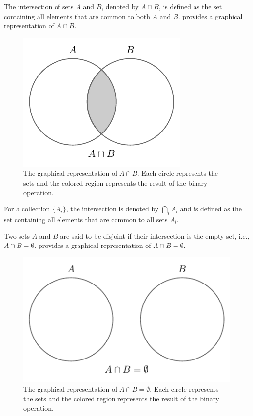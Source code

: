 \begin{definition}[Intersection]
	The intersection of sets $A$ and $B$, denoted by $A \cap B$, is defined as the set containing all elements that are common to both $A$ and $B$.  provides a graphical representation of $A \cap B$.
	\begin{figure}[H]
		\centering
		\includegraphics[]{figures/set_intersection.pdf}
		\caption{The graphical representation of $A\cap B$. Each circle represents the sets and the colored region represents the result of the binary operation.}
		\label{fig:set_intersection}
	\end{figure}
\end{definition}

\begin{definition}
	For a collection $\{A_i\}$, the intersection is denoted by $\bigcap_{i} A_i$ and is defined as the set containing all elements that are common to all sets $A_i$.
\end{definition}

\begin{definition}[Disjoint]
	Two sets $A$ and $B$ are said to be disjoint if their intersection is the empty set, i.e., $A \cap B = \emptyset$.  provides a graphical representation of $A \cap B=\emptyset$.
	\begin{figure}[H]
		\centering
		\includegraphics[]{figures/set_disjoint.pdf}
		\caption{The graphical representation of $A\cap B= \emptyset$. Each circle represents the sets and the colored region represents the result of the binary operation.}
		\label{fig:set_disjoint}
	\end{figure}
\end{definition}


